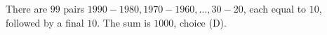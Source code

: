 There are $99$ pairs $1990-1980,1970-1960,\ldots,30-20$, each equal to $10$, followed by a final $10$. The sum is $\boxed{1000}$, choice (D).
